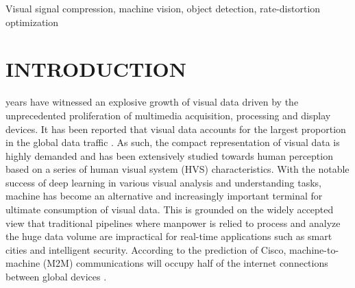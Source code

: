 \documentclass[transmag]{IEEEtran}
\begin{document}
{\begin{IEEEkeywords}
Visual signal compression, machine vision, object detection,  rate-distortion optimization
\end{IEEEkeywords}

}

\maketitle

\section{INTRODUCTION}

 years have witnessed an explosive growth of visual data  
driven by the unprecedented proliferation of multimedia acquisition, processing and display devices. It has been reported that visual data accounts for the largest proportion in the global data traffic \cite{cisco2019cisco}. As such, the compact representation of visual data is highly demanded and has been extensively studied towards human perception based on a series of human visual system (HVS) characteristics. With the notable success of deep learning in various visual analysis and understanding tasks, machine has become an alternative and increasingly important terminal for ultimate consumption of visual data. This is grounded on the widely accepted view that traditional pipelines where manpower is relied to process and analyze the huge data volume are impractical for real-time applications such as smart cities and intelligent security. According to the prediction of Cisco, machine-to-machine (M2M) communications will occupy half of the internet connections between global devices \cite{cisco2020cisco}.  
\end{document}
